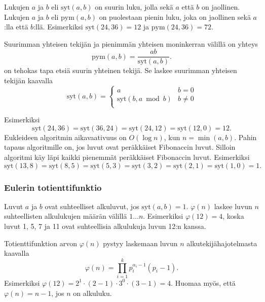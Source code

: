 
Lukujen $a$ ja $b$  eli $\textrm{syt}(a,b)$
on suurin luku, jolla sekä $a$ että $b$ on jaollinen.
Lukujen $a$ ja $b$  eli $\textrm{pym}(a,b)$
on puolestaan pienin luku, joka on jaollinen sekä $a$:lla että $b$:llä.
Esimerkiksi $\textrm{syt}(24,36)=12$ ja
$\textrm{pym}(24,36)=72$.

Suurimman yhteisen tekijän ja pienimmän yhteisen
moninkerran välillä on yhteys
\[\textrm{pym}(a,b)=\frac{ab}{\textrm{syt}(a,b)}.\]
 on tehokas tapa etsiä
suurin yhteinen tekijä.
Se laskee suurimman yhteisen tekijän kaavalla
\begin{equation*}
    \textrm{syt}(a,b) = \begin{cases}
               a        & b = 0\\
               \textrm{syt}(b,a \bmod b) & b \neq 0\\
           \end{cases}
\end{equation*}

\noindent
Esimerkiksi
\[\textrm{syt}(24,36) = \textrm{syt}(36,24)
= \textrm{syt}(24,12) = \textrm{syt}(12,0)=12.\]
Eukleideen algoritmin aikavaativuus
on $O(\log n)$, kun $n=\min(a,b)$.
Pahin tapaus algoritmille on, jos luvut ovat
peräkkäiset Fibonaccin luvut.
Silloin algoritmi käy läpi kaikki pienemmät
peräkkäiset Fibonaccin luvut.
Esimerkiksi
\[\textrm{syt}(13,8)=\textrm{syt}(8,5)
=\textrm{syt}(5,3)=\textrm{syt}(3,2)=\textrm{syt}(2,1)=\textrm{syt}(1,0)=1.\]

\subsubsection{Eulerin totienttifunktio}


Luvut $a$ ja $b$ ovat suhteelliset alkuluvut,
jos $\textrm{syt}(a,b)=1$.
 $\varphi(n)$
laskee luvun $n$ suhteellisten alkulukujen
määrän välillä $1 \ldots n$.
Esimerkiksi $\varphi(12)=4$,
koska luvut 1, 5, 7 ja 11 ovat suhteellisia
alkulukuja luvun 12:n kanssa.

Totienttifunktion arvon $\varphi(n)$ pystyy laskemaan
luvun $n$ alkutekijähajotelmasta kaavalla
\[ \varphi(n) = \prod_{i=1}^k p_i^{\alpha_i-1}(p_i-1). \]
Esimerkiksi $\varphi(12)=2^1 \cdot (2-1) \cdot 3^0 \cdot (3-1)=4$.
Huomaa myös, että $\varphi(n)=n-1$,
jos $n$ on alkuluku.

